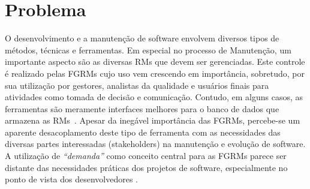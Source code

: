 %

%

\section{Problema}
\label{sec:intro-problema}

O desenvolvimento e a manutenção de software envolvem diversos tipos de métodos,
técnicas e ferramentas. Em especial no processo de Manutenção, um importante
aspecto são as diversas RMs que devem ser gerenciadas. Este controle é realizado
pelas FGRMs cujo uso vem crescendo em importância, sobretudo, por sua utilização
por gestores, analistas da qualidade e usuários finais para atividades como
tomada de decisão e comunicação. Contudo, em alguns casos, as ferramentas são
meramente interfaces melhores para o banco de dados que armazena as
RMs~\cite{zimmermann2009improving}. Apesar da inegável importância das FGRMs,
percebe-se um aparente desacoplamento deste tipo de ferramenta com as
necessidades das diversas partes interessadas (stakeholders) na manutenção e
evolução de software. A utilização de \textit{``demanda''} como conceito central
para as FGRMs parece ser distante das necessidades práticas dos projetos de
software, especialmente no ponto de vista dos desenvolvedores
\cite{Baysal:2013:SAP:2486788.2486957}.


